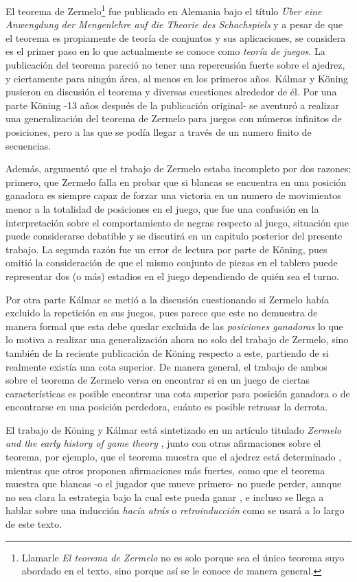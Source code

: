 \documentclass[twoside,openright,12pt,a4paper,spanish]{book}
\begin{document}
El teorema de Zermelo\footnote{Llamarle \textit{El teorema de Zermelo} no es solo porque sea el único teorema suyo abordado en el texto, sino porque así se le conoce de manera general.} fue publicado en Alemania bajo el título \textit{Über eine Anwengdung der Mengenlehre auf die Theorie des Schachspiels} y a pesar de que el teorema es propiamente de teoría de conjuntos y sus aplicaciones, se considera es el primer paso en lo que actualmente se conoce como \textit{teoría de juegos}. La publicación del teorema pareció no tener una repercusión fuerte sobre el ajedrez, y ciertamente para ningún área, al menos en los primeros años. Kálmar y Köning pusieron en discusión el teorema y diversas cuestiones alrededor de él. Por una parte Köning -13 años después de la publicación original- se aventuró a realizar una generalización del teorema de Zermelo para juegos con números infinitos de posiciones, pero a las que se podía llegar a través de un numero finito de secuencias.

Además, argumentó que el trabajo de Zermelo estaba incompleto por dos razones; primero, que Zermelo falla en probar que si blancas se encuentra en una posición ganadora es siempre capaz de forzar una victoria en un numero de movimientos menor a la totalidad de posiciones en el juego, que fue una confusión en la interpretación sobre el comportamiento de negras respecto al juego, situación que puede considerarse debatible y se discutirá en un capitulo posterior del presente trabajo. La segunda razón fue un error de lectura por parte de Köning, pues omitió la consideración de que el mismo conjunto de piezas en el tablero puede representar dos (o más) estadios en el juego dependiendo de quién sea el turno.

Por otra parte Kálmar se metió a la discusión cuestionando si Zermelo había excluido la repetición en sus juegos, pues parece que este no demuestra de manera formal que esta debe quedar excluida de las \textit{posiciones ganadoras} lo que lo motiva a realizar una generalización ahora no solo del trabajo de Zermelo, sino también de la reciente publicación de Köning respecto a este, partiendo de si realmente existía una cota superior. De manera general, el trabajo de ambos sobre el teorema de Zermelo versa en encontrar si en un juego de ciertas características es posible encontrar una cota superior para posición ganadora o de encontrarse en una posición perdedora, cuánto es posible retrasar la derrota. 

El trabajo de Köning y Kálmar está sintetizado en un artículo titulado \textit{Zermelo and the early history of game theory} \cite{schwalbe2001zermelo}, junto con otras  afirmaciones sobre el teorema, por ejemplo, que el teorema muestra que el ajedrez está determinado \cite[p. 1]{aumann2019lectures}, mientras que otros proponen afirmaciones más fuertes, como que el teorema muestra que blancas -o el jugador que mueve primero- no puede perder, aunque no sea clara la estrategia bajo la cual este pueda ganar \cite[p. 107]{dimand1996history}, e incluso se llega a hablar sobre una inducción \textit{hacía atrás} \cite[p. 32]{binmore1994teoria} o \textit{retroinducción} como se usará a lo largo de este texto.
\end{document}
